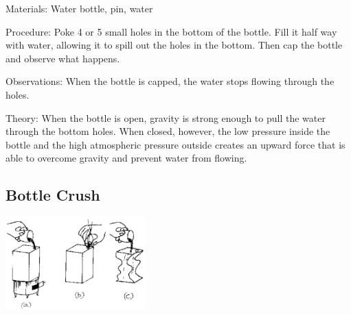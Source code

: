 \begin{multicols}{2}
\begin{description*}
\item[Materials:]{Water bottle, pin, water}
\item[Procedure:]{Poke 4 or 5 small holes in the bottom of the bottle. Fill it half way with water, allowing it to spill out the holes in the bottom. Then cap the bottle and observe what happens.}
\item[Observations:]{When the bottle is capped, the water stops flowing through the holes.}
\item[Theory:]{When the bottle is open, gravity is strong enough to pull the water through the bottom holes. When closed, however, the low pressure inside the bottle and the high atmospheric pressure outside creates an upward force that is able to overcome gravity and prevent water from flowing.}
\end{description*}

\subsection{Bottle Crush}

\begin{center}
\includegraphics[width=0.4\textwidth]{./img/source/bottle-crush.png}
\end{center}


\end{multicols}
